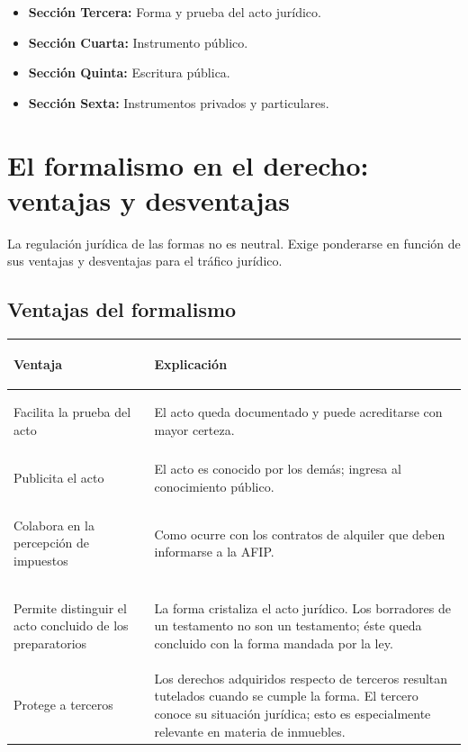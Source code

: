 \documentclass[12pt,oneside]{book}
\begin{document}
\begin{itemize}
    \item \textbf{Sección Tercera:} Forma y prueba del acto jurídico.
    \item \textbf{Sección Cuarta:} Instrumento público.
    \item \textbf{Sección Quinta:} Escritura pública.
    \item \textbf{Sección Sexta:} Instrumentos privados y particulares.
\end{itemize}

\section{El formalismo en el derecho: ventajas y desventajas}

La regulación jurídica de las formas no es neutral. Exige ponderarse en función de sus ventajas y desventajas para el tráfico jurídico.

\subsection{Ventajas del formalismo}

\begin{table}[H]
\centering
\begin{tabularx}{\textwidth}{>{\bfseries\raggedright\arraybackslash}p{}
                              >{\raggedright\arraybackslash}X}
\toprule
Ventaja & Explicación \\
\midrule
Facilita la prueba del acto & El acto queda documentado y puede acreditarse con mayor certeza. \\[4pt]
Publicita el acto & El acto es conocido por los demás; ingresa al conocimiento público. \\[4pt]
Colabora en la percepción de impuestos & Como ocurre con los contratos de alquiler que deben informarse a la AFIP. \\[4pt]
Permite distinguir el acto concluido de los preparatorios & La forma cristaliza el acto jurídico. Los borradores de un testamento no son un testamento; éste queda concluido con la forma mandada por la ley. \\[4pt]
Protege a terceros & Los derechos adquiridos respecto de terceros resultan tutelados cuando se cumple la forma. El tercero conoce su situación jurídica; esto es especialmente relevante en materia de inmuebles. \\
\bottomrule
\end{tabularx}
\end{table}
\end{document}
